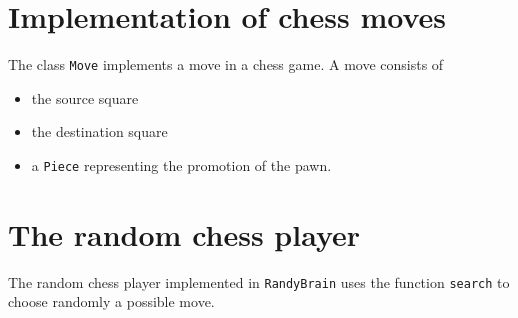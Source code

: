 \documentclass [12pt ,a4paper, naustrian]{scrartcl}
\theoremstyle{plain}
\theoremstyle{definition}
\theoremstyle{remark}
\begin{document}
\section{Implementation of chess moves}
		The class \verb+Move+ implements a move in a chess game. A move consists of 
		\begin{itemize}
			\item the source square
			\item the destination square
			\item a \verb+Piece+ representing the promotion of the pawn.
		\end{itemize}
		
\section{The random chess player}
	The random chess player implemented in \verb+RandyBrain+ uses the function \verb+search+ to choose randomly a possible move.
\end{document}
